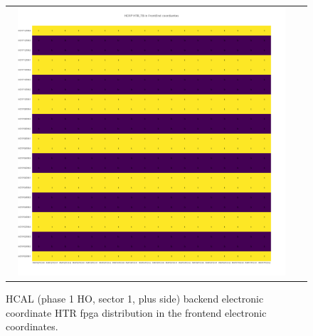 \begin{figure}[htb]
 \begin{center}
  \begin{tabular}{cc}
   \includegraphics[angle=0,width=0.95\textwidth]{figures/appendix/HO1P_HTR_TB_in_FrontEnd.png}
  \end{tabular}
  \caption{HCAL (phase 1 HO, sector 1, plus side) backend electronic coordinate HTR fpga distribution in the frontend electronic coordinates.}
  \label{fig:lmapHO1PHTRTBFEC}
 \end{center}
\end{figure}
\clearpage

